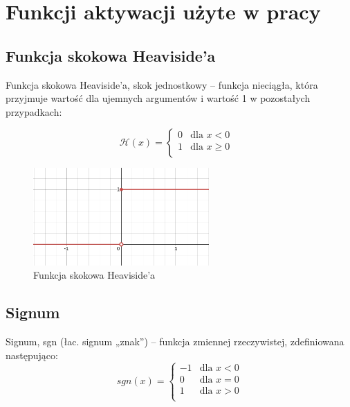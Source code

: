 \documentclass{article}
\begin{document}
\section{Funkcji aktywacji użyte w pracy}

\subsection{Funkcja skokowa Heaviside’a}
Funkcja skokowa Heaviside’a, skok jednostkowy – funkcja nieciągła, która przyjmuje wartość dla ujemnych argumentów i wartość 1 w pozostałych przypadkach:

\begin{equation}
	\mathcal{H}(x) = 
	\begin{cases}
		0 & \text{dla $x < 0$}\\
		1 & \text{dla $x \geqslant 0$ }\\
	\end{cases}    
\end{equation}

\begin{figure}[H]
	\centering
	\includegraphics[width=0.6\textwidth,keepaspectratio=true]{Heaviside}
	\caption{
		Funkcja skokowa Heaviside’a
	}
	\label{Heaviside}
\end{figure}


\subsection{Signum}
Signum, sgn (łac. signum „znak”) – funkcja zmiennej rzeczywistej, zdefiniowana następująco:
\begin{equation}
	sgn(x) = 
	\begin{cases}
		-1 & \text{dla $x < 0$}\\
		0 & \text{dla $x = 0$}\\
		1 & \text{dla $x > 0$}\\
	\end{cases}    
\end{equation}
\end{document}
